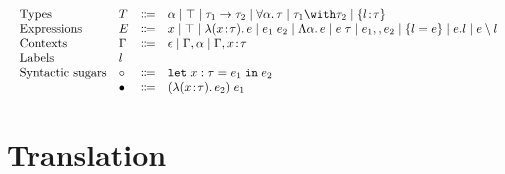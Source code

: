 \documentclass[a4paper]{article}
\begin{document}
\begin{displaymath}
    \begin{array}{l}
      \begin{array}{llrl}
        \text{Types}
        & T & \Coloneqq & \alpha \mid \top \mid \tau_1 \to \tau_2 \mid \for \alpha \tau \mid \tau_1 \andop \tau_2 \mid \recty l \tau \\
        \text{Expressions}
        & E & \Coloneqq & x \mid \top \mid \lam x \tau e \mid \app {e_1} {e_2} \mid \blam \alpha e \mid \tapp e \tau \mid e_1 \mergeop e_2 \mid \reccon l e \mid e.l \mid e \restrictop l\\
        \text{Contexts} & \Gamma & \Coloneqq & \epsilon \mid \Gamma, \alpha \mid \Gamma, x \hast \tau \\
        \text{Labels} & l \\
        \text{Syntactic sugars} & \circ & \Coloneqq & \letexpr {x:\tau} {e_1} {e_2} \\
        & \bullet & \Coloneqq & \app {(\lam x \tau {e_2})} {e_1}
      \end{array}
    \end{array}
\end{displaymath}
  
\section{Translation}

\begin{mathpar}

    
    
\end{mathpar}
\end{document}
